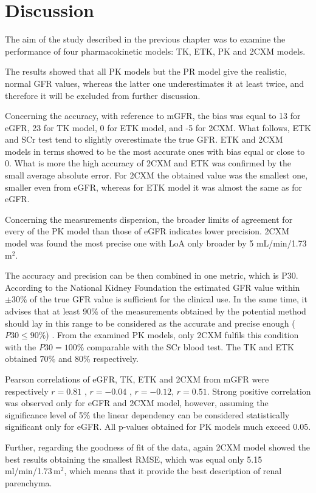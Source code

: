 \chapter{Discussion}
The aim of the study described in the previous chapter was to examine the performance of four pharmacokinetic models: TK, ETK, PK and 2CXM models.   

The results showed that all PK models but the PR model give the realistic, normal GFR values, whereas the latter one underestimates it at least twice, and therefore it will be excluded from further discussion. 

Concerning the accuracy, with reference to mGFR, the bias was equal to 13 for eGFR, 23 for TK model, 0 for ETK model, and -5 for 2CXM. What follows, ETK and SCr test tend to slightly overestimate the true GFR. 
ETK and 2CXM models in terms showed to be the most accurate ones with bias equal or close to 0. 
What is more the high accuracy of 2CXM and ETK was confirmed by the small average absolute error. For 2CXM the obtained value was the smallest one, smaller even from eGFR, whereas for ETK model it was almost the same as for eGFR.

Concerning the measurements dispersion, the broader limits of agreement for every of the PK model than those of eGFR indicates lower precision. 2CXM model was found the most precise one with LoA only broader by 5 mL/min/1.73\,m$^2$.     

The accuracy and precision can be then combined in one metric, which is P30.  
According to the National Kidney Foundation the estimated GFR value within $\pm30\%$ of the true GFR value is sufficient for the clinical use. In the same time, it advises that at least 90\% of the measurements obtained by the potential method should lay in this range to be considered as the accurate and precise enough ($P30\leqslant90\%$) \cite{levey2003national}. From the examined PK models, only 2CXM fulfils this condition with the $P30=100\%$ comparable with  the SCr blood test. The TK and ETK obtained 70\% and 80\% respectively.   

Pearson correlations of eGFR, TK, ETK and 2CXM from mGFR were respectively $r=0.81$ , $r=-0.04$ , $r=-0.12$, $r=0.51$. Strong positive correlation was observed only for eGFR and 2CXM model, however, assuming the significance level of 5\% the linear dependency can be considered statistically significant only for eGFR. All p-values obtained for PK models much exceed 0.05.  

Further, regarding the goodness of fit of the data, again 2CXM model showed the best results obtaining the smallest RMSE, which was equal only 5.15 ml/min/1.73\,m$^2$, which means that it provide the best description of renal parenchyma.  

